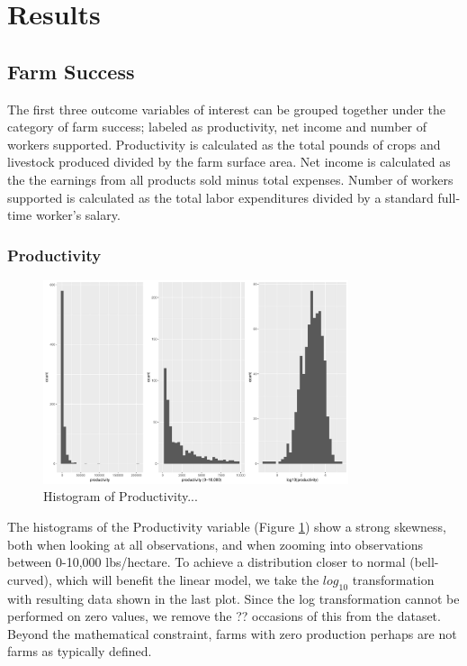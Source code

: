 \documentclass{article}
\begin{document}
\section{Results}

\subsection{Farm Success}

The first three outcome variables of interest can be grouped together under the category of farm success; labeled as 
productivity, net income and number of workers supported. Productivity is calculated as the total pounds of crops and livestock 
produced divided by the farm surface area. Net income is calculated as the the earnings from all products 
sold minus total expenses. Number of workers supported is calculated as the total labor expenditures divided by a standard 
full-time worker's salary.

\subsubsection{Productivity}

\begin{figure}[h]
\centering
\includegraphics[width = 0.8\textwidth]{production_histograms.pdf}
\caption{Histogram of Productivity...}
\label{figure:prod_hist}
\end{figure}

The histograms of the Productivity variable (Figure \ref{figure:prod_hist}) show a strong skewness, both when looking at all 
observations, and when zooming into observations between 0-10,000 lbs/hectare. To achieve a distribution closer to normal 
(bell-curved), which will benefit the linear model, we take the $log_{10}$ transformation with resulting data shown in the last 
plot. Since the log transformation cannot be performed on zero values, we remove the ?? occasions of this from the dataset. 
Beyond the mathematical constraint, farms with zero production perhaps are not farms as typically defined.
\end{document}
